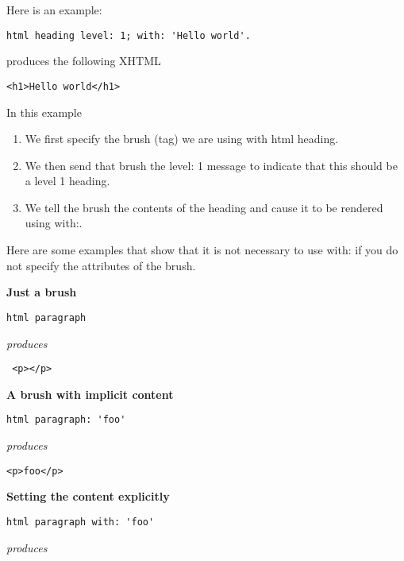 \documentclass[a4paper,10pt,twoside]{book}
\newcommand{\ct}[1]{{\small\ttfamily\textup{#1}}}
\begin{document}
Here is an example:

\begin{lstlisting}
html heading level: 1; with: 'Hello world'.
\end{lstlisting}

produces the following XHTML

\begin{lstlisting}
<h1>Hello world</h1>
\end{lstlisting}

In this example

\begin{enumerate}
\item  We first specify the brush (tag) we are using with \ct{html heading}.
\item  We then send that brush the \ct{level: 1} message to indicate that this should be a level 1 heading.
\item  We tell the brush the contents of the heading and cause it to be rendered using \ct{with:}.
\end{enumerate}

Here are some examples that show that it is not necessary to use \ct{with:} if you do not specify the attributes of the brush.

\textbf{Just a brush}

\begin{lstlisting}
html paragraph
\end{lstlisting}
\textit{produces}

\begin{lstlisting}
 <p></p>
\end{lstlisting}

\textbf{A brush with implicit content}

\begin{lstlisting}
html paragraph: 'foo'
\end{lstlisting}
\textit{produces} 

\begin{lstlisting}
<p>foo</p>
\end{lstlisting}

\textbf{Setting the content explicitly}

\begin{lstlisting}
html paragraph with: 'foo'
\end{lstlisting}
\textit{produces} 
\end{document}
